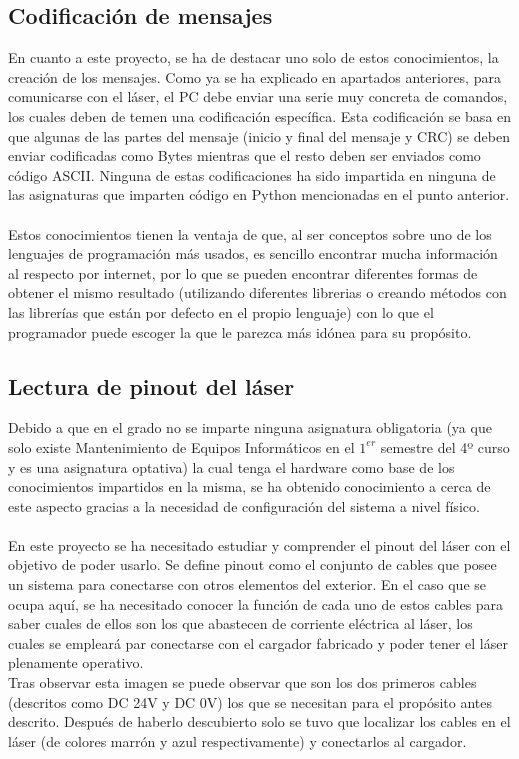 \subsection{Codificación de mensajes}
En cuanto a este proyecto, se ha de destacar uno solo de estos conocimientos, la creación de los mensajes. Como ya se ha explicado en apartados anteriores, para comunicarse con el láser, el PC debe enviar una serie muy concreta de comandos, los cuales deben de temen una codificación específica. Esta codificación se basa en que algunas de las partes del mensaje (inicio y final del mensaje y CRC) se deben enviar codificadas como Bytes mientras que el resto deben ser enviados como código ASCII. Ninguna de estas codificaciones ha sido impartida en ninguna de las asignaturas que imparten código en Python mencionadas en el punto anterior.\\
\\
Estos conocimientos tienen la ventaja de que, al ser conceptos sobre uno de los  lenguajes de programación más usados, es sencillo encontrar mucha información al respecto por internet, por lo que se pueden encontrar diferentes formas de obtener el mismo  resultado (utilizando diferentes librerias o creando métodos con las librerías que están por defecto en el propio lenguaje) con lo que el programador puede escoger la que le parezca más idónea para su propósito.\\

\subsection{Lectura de pinout del láser}
Debido a que en el grado no se imparte ninguna asignatura obligatoria (ya que solo existe Mantenimiento de Equipos  Informáticos en el $1^{er}$ semestre del 4º curso y es una asignatura optativa) la cual tenga el hardware como base de los conocimientos impartidos en la misma, se ha obtenido conocimiento a cerca de este aspecto gracias a la necesidad de configuración del sistema a nivel físico.\\
\\
En este proyecto se ha necesitado estudiar y comprender el pinout del láser con el objetivo de poder usarlo. Se define pinout como el conjunto de cables que posee un sistema para conectarse con otros elementos del exterior. En el caso que se ocupa aquí, se ha necesitado conocer la función de cada uno de estos cables para saber cuales de ellos son los que abastecen de corriente eléctrica al láser, los cuales se empleará par conectarse con el cargador fabricado y poder tener el láser plenamente operativo.\\
Tras observar esta imagen se puede observar que son los dos primeros cables (descritos como DC 24V y DC 0V) los que se necesitan para el propósito antes descrito. Después de haberlo descubierto solo se tuvo que localizar los cables en el láser (de colores marrón y azul respectivamente) y conectarlos al cargador.\\

